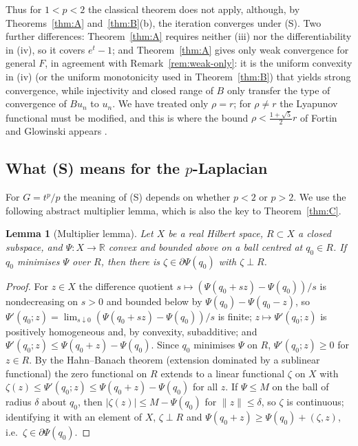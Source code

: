 \documentclass[11pt]{amsart}
\newtheorem{lemma}[theorem]{Lemma}
\theoremstyle{definition}
\theoremstyle{remark}
\numberwithin{equation}{section}
\newcommand{\R}{\mathbb{R}}
\newcommand{\abs}[1]{\lvert #1\rvert}
\newcommand{\norm}[1]{\lVert #1\rVert}
\begin{document}
Thus for $1<p<2$ the classical theorem does not apply, although, by Theorems~\ref{thm:A} and~\ref{thm:B}(b), the iteration converges under (S). Two further differences: Theorem~\ref{thm:A} requires neither (iii) nor the differentiability in (iv), so it covers $e^t-1$; and Theorem~\ref{thm:A} gives only weak convergence for general $F$, in agreement with Remark~\ref{rem:weak-only}: it is the uniform convexity in (iv) (or the uniform monotonicity used in Theorem~\ref{thm:B}) that yields strong convergence, while injectivity and closed range of $B$ only transfer the type of convergence of $Bu_n$ to $u_n$. We have treated only $\rho=r$; for $\rho\ne r$ the Lyapunov functional must be modified, and this is where the bound $\rho<\frac{1+\sqrt5}2r$ of Fortin and Glowinski appears \cite{FortinGlowinski1983ChIII,GlowinskiPanTai2016}.

\subsection{What (S) means for the $p$-Laplacian}\label{ssec:S-p}
For $G=t^p/p$ the meaning of (S) depends on whether $p<2$ or $p>2$. We use the following abstract multiplier lemma, which is also the key to Theorem~\ref{thm:C}.

\begin{lemma}[Multiplier lemma]\label{lem:multiplier}
Let $X$ be a real Hilbert space, $R\subset X$ a closed subspace, and $\Psi\colon X\to\R$ convex and bounded above on a ball centred at $q_0\in R$. If $q_0$ minimises $\Psi$ over $R$, then there is $\zeta\in\partial\Psi(q_0)$ with $\zeta\perp R$.
\end{lemma}
\begin{proof}
For $z\in X$ the difference quotient $s\mapsto(\Psi(q_0+sz)-\Psi(q_0))/s$ is nondecreasing on $s>0$ and bounded below by $\Psi(q_0)-\Psi(q_0-z)$, so $\Psi'(q_0;z)=\lim_{s\downarrow0}(\Psi(q_0+sz)-\Psi(q_0))/s$ is finite; $z\mapsto\Psi'(q_0;z)$ is positively homogeneous and, by convexity, subadditive; and $\Psi'(q_0;z)\le\Psi(q_0+z)-\Psi(q_0)$. Since $q_0$ minimises $\Psi$ on $R$, $\Psi'(q_0;z)\ge0$ for $z\in R$. By the Hahn--Banach theorem (extension dominated by a sublinear functional) the zero functional on $R$ extends to a linear functional $\zeta$ on $X$ with $\zeta(z)\le\Psi'(q_0;z)\le\Psi(q_0+z)-\Psi(q_0)$ for all $z$. If $\Psi\le M$ on the ball of radius $\delta$ about $q_0$, then $\abs{\zeta(z)}\le M-\Psi(q_0)$ for $\norm z\le\delta$, so $\zeta$ is continuous; identifying it with an element of $X$, $\zeta\perp R$ and $\Psi(q_0+z)\ge\Psi(q_0)+(\zeta,z)$, i.e.\ $\zeta\in\partial\Psi(q_0)$.
\end{proof}
\end{document}
